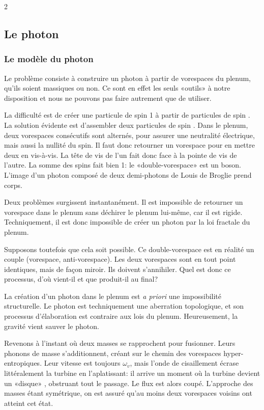 \begin{multicols}{2}
\subsection{Le photon}

\subsubsection{Le modèle du photon}

Le problème consiste à construire un photon à partir de vorespaces du plenum, qu'ils
soient massiques ou non. Ce sont en effet les seuls «outils» à notre
disposition et nous ne pouvons pas faire autrement que de
utiliser.

La difficulté est de créer une particule de spin 1 à partir de
particules de spin . La solution évidente est d'assembler deux
particules de spin . Dans le plenum, deux vorespaces consécutifs
sont alternés, pour assurer une neutralité électrique, mais aussi la
nullité du spin. Il faut donc retourner un vorespace pour en mettre
deux en vis-à-vis. La tête de vis de l'un fait donc face à la pointe
de vis de l'autre. La somme des spins fait bien 1: le
«double-vorespace» est un boson. L'image d'un photon composé de deux
demi-photons de Louis de Broglie prend corps. \cite{debroglie1934une}

Deux problèmes surgissent instantanément. Il est impossible de
retourner un vorespace dans le plenum sans déchirer le plenum lui-même, car il est rigide.
Techniquement, il est donc impossible de créer un photon par la loi
fractale du plenum.

Supposons toutefois que cela soit possible. Ce double-vorespace est en
réalité un couple (vorespace, anti-vorespace). Les deux vorespaces sont
en tout point identiques, mais de façon miroir. Ils doivent
s'annihiler. Quel est donc ce processus, d'où vient-il et que
produit-il au final?

La création d'un photon dans le plenum est \textit{a priori} une impossibilité
structurelle. Le photon est techniquement une aberration topologique,
et son processus d'élaboration est contraire aux lois du plenum.
Heureusement, la gravité vient sauver le photon.

Revenons à l'instant où deux masses se rapprochent pour fusionner. Leurs
phonons de masse s'additionnent, créant sur le chemin des
vorespaces hyper-entropiques. Leur vitesse est toujours $\omega_v$, mais
l'onde de cisaillement écrase littéralement la turbine en
l'aplatissant: il arrive un moment où la turbine devient un
«disque» , obstruant tout le passage. Le flux est alors coupé.
L'approche des masses étant symétrique, on est assuré qu'au moins deux
vorespaces voisins ont atteint cet état.


\end{multicols}
